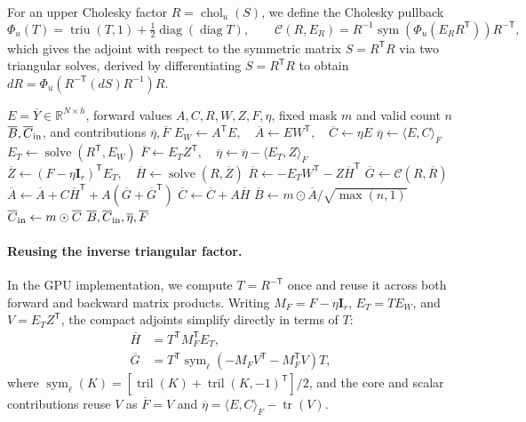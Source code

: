 \documentclass[10pt,twocolumn]{article}
\let\draftsmall\small
\renewcommand{\small}{\draftsmall\fontsize{9}{10}\selectfont}
\newcommand{\R}{\mathbb{R}}
\newcommand{\I}{\mathbf{I}}
\newcommand{\T}{\mathsf{T}}
\newcommand{\tr}{\operatorname{tr}}
\newcommand{\sym}{\operatorname{sym}}
\newcommand{\diag}{\operatorname{diag}}
\newcommand{\tril}{\operatorname{tril}}
\newcommand{\triu}{\operatorname{triu}}
\newcommand{\Solve}{\operatorname{solve}}
\newcommand{\Chol}{\operatorname{chol}_{u}}
\begin{document}
For an upper Cholesky factor $R=\Chol(S)$, we define the Cholesky pullback
\begin{equation}
 \Phi_u(T)=\triu(T,1)+\tfrac12\diag(\diag T),\qquad
 \mathcal C(R,E_R)=R^{-1}\sym\!\left(\Phi_u(E_RR^\T)\right)R^{-\T},
 \label{eq:chol-adjoint}
\end{equation}
which gives the adjoint with respect to the symmetric matrix $S=R^\T R$ via
two triangular solves, derived by differentiating $S=R^\T R$ to obtain
$dR=\Phi_u(R^{-\T}(dS)R^{-1})R$.

\begin{algorithm}[!ht]
\caption{Rank-space backward ($N>r$, one sample and head)}
\label{alg:backward}
\small
\begin{algorithmic}[1]
\Require $E=\overline Y\in\R^{N\times h}$, forward values $A,C,R,W,Z,F,\eta$,
 fixed mask $m$ and valid count $n$
\Ensure $\overline B,\overline C_{\rm in}$, and contributions $\overline\eta,\overline F$
\State $E_W\gets A^\T E,\quad \overline A\gets EW^\T,\quad \overline C\gets\eta E$
\State $\overline\eta\gets\langle E,C\rangle_F$
\State $E_T\gets\Solve(R^\T,E_W)$
\State $\overline F\gets E_TZ^\T,\quad \overline\eta\gets\overline\eta-\langle E_T,Z\rangle_F$
\State $\overline Z\gets(F-\eta\I_r)^\T E_T,\quad \overline H\gets\Solve(R,\overline Z)$
\State $\overline R\gets-E_TW^\T-Z\overline H^\T$
\State $\overline G\gets\mathcal C(R,\overline R)$ 
\State $\overline A\gets\overline A+C\overline H^\T+A(\overline G+\overline G^\T)$
\State $\overline C\gets\overline C+A\overline H$
\State $\overline B\gets m\odot\overline A/\sqrt{\max(n,1)}$
\State $\overline C_{\rm in}\gets m\odot\overline C$
\State \Return $\overline B,\overline C_{\rm in},\overline\eta,\overline F$
\end{algorithmic}
\end{algorithm}

\paragraph{Reusing the inverse triangular factor.}
In the GPU implementation, we compute $T=R^{-\T}$ once and reuse it across
both forward and backward matrix products.
Writing $M_F=F-\eta\I_r$, $E_T=TE_W$, and $V=E_TZ^\T$, the compact adjoints
simplify directly in terms of $T$:
\begin{align}
 \overline H&=T^\T M_F^\T E_T,\\
 \overline G&=T^\T\operatorname{sym}_{\ell}
       (-M_FV^\T-M_F^\T V)T,
 \label{eq:inverse-factor-adjoint}
\end{align}
where $\operatorname{sym}_{\ell}(K)=[\tril(K)+\tril(K,-1)^\T]/2$, and the
core and scalar contributions reuse $V$ as $\overline F=V$ and
$\overline\eta=\langle E,C\rangle_F-\tr(V)$.
\end{document}
